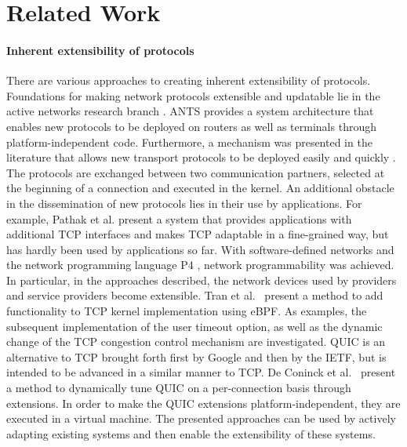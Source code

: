 \section{Related Work}




\paragraph{Inherent extensibility of protocols}
There are various approaches to creating inherent extensibility of protocols.
Foundations for making network protocols extensible and updatable lie in the active networks research branch \cite{A3:tennenhouse1996towards, A3:tennenhouse1997survey}.
ANTS \cite{A3:wetherall1998ants} provides a system architecture that enables new protocols to be deployed on routers as well as terminals through platform-independent code.
Furthermore, a mechanism was presented in the literature that allows new transport protocols to be deployed easily and quickly \cite{A3:patel2003upgrading}. The protocols are exchanged between two communication partners, selected at the beginning of a connection and executed in the kernel.
An additional obstacle in the dissemination of new protocols lies in their use by applications. 
For example, Pathak et al. \cite{A3:pathak2015modnet} present a system that provides applications with additional TCP interfaces and makes TCP adaptable in a fine-grained way, but has hardly been used by applications so far.
With software-defined networks \cite{A3:mckeown2008openflow} and the network programming language P4 \cite{A3:bosshart2014p4}, network programmability was achieved. 
In particular, in the approaches described, the network devices used by providers and service providers become extensible.
Tran et al.~\cite{A3:tran2019beyond} present a method to add functionality to TCP kernel implementation using eBPF. 
As examples, the subsequent implementation of the user timeout option, as well as the dynamic change of the TCP congestion control mechanism are investigated.
QUIC is an alternative to TCP brought forth first by Google and then by the IETF, but is intended to be advanced in a similar manner to TCP.
De Coninck et al.~\cite{A3:de2019pluginizing,A3:de2018tuning} present a method to dynamically tune QUIC on a per-connection basis through extensions. In order to make the QUIC extensions platform-independent, they are executed in a virtual machine.
The presented approaches can be used by actively adapting existing systems and then enable the extensibility of these systems.


